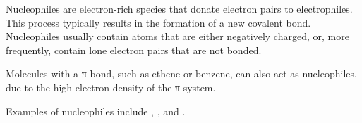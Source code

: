 		Nucleophiles are electron-rich species that donate electron pairs to electrophiles. This process typically results
		in the formation of a new covalent bond. Nucleophiles usually contain atoms that are either negatively charged, or,
		more frequently, contain lone electron pairs that are not bonded.

		Molecules with a π-bond, such as ethene or benzene, can also act as nucleophiles, due to the high electron
		density of the π-system.

		Examples of nucleophiles include , , and .























